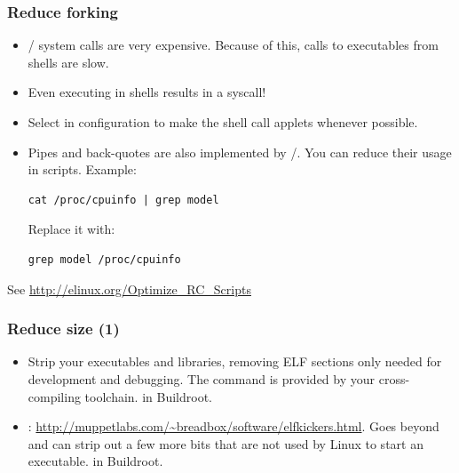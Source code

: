 \begin{frame}[fragile]
\frametitle{Reduce forking}
\begin{itemize}
	\item {}/ system calls are very expensive.
		Because of this, calls to executables from shells are slow.
	\item Even executing  in  shells results
	      in a  syscall!
	\item Select  in 
	      configuration to make the  shell call applets
	      whenever possible.
	\item Pipes and back-quotes are also implemented by
	      /.  You can reduce their usage in
	      scripts. Example:
	      \begin{block}{}
			\begin{verbatim}
cat /proc/cpuinfo | grep model
			\end{verbatim}
		\end{block}
		Replace it with:
		\begin{block}{}
			\begin{verbatim}
grep model /proc/cpuinfo
			\end{verbatim}
		\end{block}
\end{itemize}
See \url{http://elinux.org/Optimize_RC_Scripts}
\end{frame}

\begin{frame}
\frametitle{Reduce size (1)}
\begin{itemize}
	\item Strip your executables and libraries, removing ELF sections
		only needed for development and debugging. The 
		command is provided by your cross-compiling toolchain.
		 in Buildroot.
	\item {}:
		\url{http://muppetlabs.com/~breadbox/software/elfkickers.html}.
		Goes beyond  and can strip out a few more bits
		that are not used by Linux to start an executable.
		 in Buildroot.
\end{itemize}
\end{frame}

